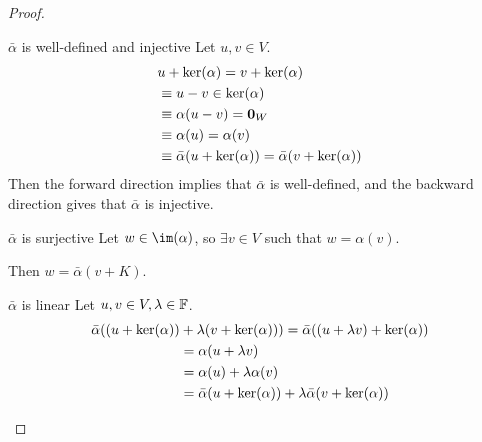 \documentclass[../Main.tex]{subfiles}
\begin{document}
\begin{proof}
    \begin{subproof}{$\bar{\alpha}$ is well-defined and injective}
        Let $u, v \in V$.
        \begin{align*}
            &u + \ker(\alpha) = v + \ker(\alpha) \\
            &\equiv u - v \in \ker(\alpha) \\
            &\equiv \alpha(u - v) = \boldsymbol{0}_W \\
            &\equiv \alpha(u) = \alpha(v) \\
            &\equiv \bar\alpha (u + \ker(\alpha)) = \bar\alpha(v + \ker(\alpha))
        \end{align*}
        Then the forward direction implies that $\bar\alpha$ is well-defined, and the backward direction gives that $\bar\alpha$ is injective.
    \end{subproof}
    \begin{subproof}{$\bar\alpha$ is surjective}
        Let $w \in \im(\alpha)$, so $\exists v \in V$ such that $w = \alpha(v)$.

        Then $w = \bar\alpha(v + K)$.
    \end{subproof}
    \begin{subproof}{$\bar\alpha$ is linear}
        Let $u, v \in V, \lambda \in \mathbb{F}$.
        \begin{align*}
            \bar\alpha((u + \ker(\alpha)) &+ \lambda (v + \ker(\alpha))) = \bar\alpha((u + \lambda v) + \ker(\alpha)) \\
            &= \alpha(u + \lambda v) \\
            &= \alpha(u) + \lambda \alpha(v) \\
            &= \bar\alpha(u + \ker(\alpha)) + \lambda\bar\alpha(v + \ker(\alpha))
        \end{align*}
    \end{subproof}
\end{proof}
\end{document}
